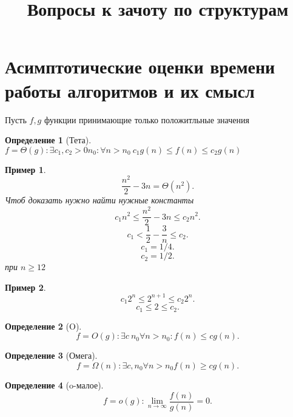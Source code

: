 \documentclass[14pt]{extarticle}
\title{Вопросы к зачоту по структурам}
\author{}
\date{}
\newtheorem{definition}{Определение}
\newtheorem{example}{Пример}[definition]
\begin{document}
    \maketitle
    \section{Асимптотические оценки времени работы алгоритмов и их смысл}
    Пусть $f,g$ функции принимающие только положитльные значения
    \begin{definition}[Тета]
        $f = \Theta(g) : \exists c_1,c_2 > 0  n_0 : \forall  n > n_0 ~ c_1 g(n) \le f(n) \le  c_2 g(n)$ 
    \end{definition}
    \begin{example}
        \[
        \frac{n^2}{2} - 3n = \Theta(n^2)
        .\] 
        Чтоб доказать нужно найти нужные константы
        \[
        c_1 n^2 \le  \frac{n^2}{2} - 3n \le c_2 n^2
        .\] 
        \[
        c_1 < \frac{1}{2} - \frac{3}{n} \le  c_2 
        .\] 
        \[
        c_1 = 1/4
        .\] 
        \[
        c_2 = 1/2
        .\] 
        при $n \ge  12$
    \end{example}
    \begin{example}
        \[
        c_1 2^{n} \le 2^{n + 1} \le  c_2 2^{n}
        .\] 
        \[
        c_1 \le  2 \le  c_2
        .\] 
    \end{example}
    \begin{definition}[O]
        \[
        f = O(g) : \exists  c ~n_0 \forall  n > n_0: f(n) \le  c g(n)
        .\] 
    \end{definition}
    \begin{definition}[Омега]
        \[
        f =  \Omega(n) : \exists  c, n_0 \forall  n > n_0 f(n) \ge  cg(n)
        .\] 
    \end{definition}
    \begin{definition}[o-малое]
        \[
        f = o(g) : \lim_{n \to \infty} \frac{f(n)}{g(n)} = 0
        .\] 
    \end{definition}
\end{document}
